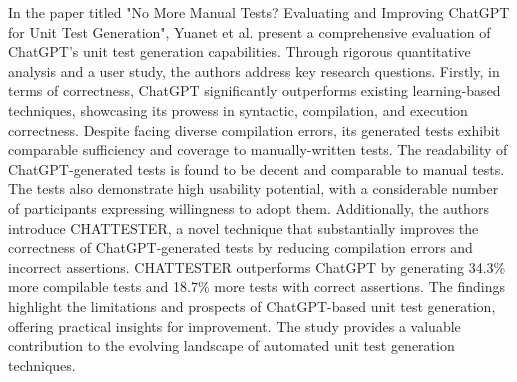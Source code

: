 In the paper titled "No More Manual Tests? Evaluating and Improving ChatGPT for Unit Test Generation"\cite{yuan_no_2023}, Yuanet et al. present a comprehensive evaluation of ChatGPT's unit test generation capabilities. Through rigorous quantitative analysis and a user study, the authors address key research questions. Firstly, in terms of correctness, ChatGPT significantly outperforms existing learning-based techniques, showcasing its prowess in syntactic, compilation, and execution correctness. Despite facing diverse compilation errors, its generated tests exhibit comparable sufficiency and coverage to manually-written tests. The readability of ChatGPT-generated tests is found to be decent and comparable to manual tests. The tests also demonstrate high usability potential, with a considerable number of participants expressing willingness to adopt them. Additionally, the authors introduce CHATTESTER\cite{yuan_no_2023}, a novel technique that substantially improves the correctness of ChatGPT-generated tests by reducing compilation errors and incorrect assertions. CHATTESTER outperforms ChatGPT by generating 34.3\% more compilable tests and 18.7\% more tests with correct assertions. The findings highlight the limitations and prospects of ChatGPT-based unit test generation, offering practical insights for improvement. The study provides a valuable contribution to the evolving landscape of automated unit test generation techniques.